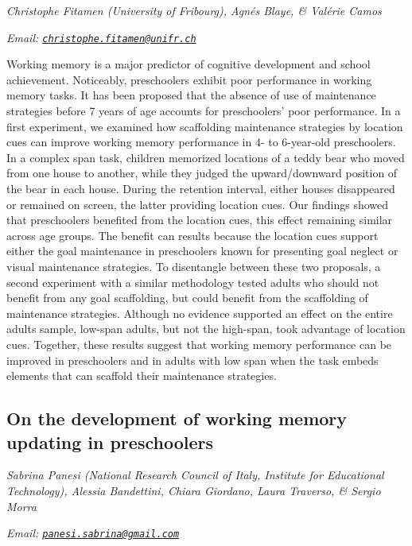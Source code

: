 \documentclass[
  12pt,
]{book}
\begin{document}
\emph{Christophe Fitamen (University of Fribourg), Agnés Blaye, \& Valérie Camos}

\emph{Email: \href{mailto:christophe.fitamen@unifr.ch}{\nolinkurl{christophe.fitamen@unifr.ch}}}

Working memory is a major predictor of cognitive development and school achievement. Noticeably, preschoolers exhibit poor performance in working memory tasks. It has been proposed that the absence of use of maintenance strategies before 7 years of age accounts for preschoolers' poor performance. In a first experiment, we examined how scaffolding maintenance strategies by location cues can improve working memory performance in 4- to 6-year-old preschoolers. In a complex span task, children memorized locations of a teddy bear who moved from one house to another, while they judged the upward/downward position of the bear in each house. During the retention interval, either houses disappeared or remained on screen, the latter providing location cues. Our findings showed that preschoolers benefited from the location cues, this effect remaining similar across age groups. The benefit can results because the location cues support either the goal maintenance in preschoolers known for presenting goal neglect or visual maintenance strategies. To disentangle between these two proposals, a second experiment with a similar methodology tested adults who should not benefit from any goal scaffolding, but could benefit from the scaffolding of maintenance strategies. Although no evidence supported an effect on the entire adults sample, low-span adults, but not the high-span, took advantage of location cues. Together, these results suggest that working memory performance can be improved in preschoolers and in adults with low span when the task embeds elements that can scaffold their maintenance strategies.

\hypertarget{on-the-development-of-working-memory-updating-in-preschoolers}{%
\subsection{On the development of working memory updating in preschoolers}\label{on-the-development-of-working-memory-updating-in-preschoolers}}

\emph{Sabrina Panesi (National Research Council of Italy, Institute for Educational Technology), Alessia Bandettini, Chiara Giordano, Laura Traverso, \& Sergio Morra}

\emph{Email: \href{mailto:panesi.sabrina@gmail.com}{\nolinkurl{panesi.sabrina@gmail.com}}}
\end{document}
